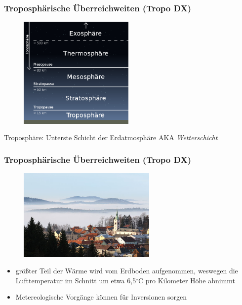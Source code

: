 \begin{frame}
  \frametitle{Troposphärische Überreichweiten (Tropo DX)}

  \begin{center}
    \begin{figure}
      \includegraphics[width=0.5\textwidth,height=.6\textheight,keepaspectratio]{bv11/Atmosphaere_Stufen.png}
    \end{figure}
  \end{center}

  Troposphäre: Unterste Schicht der Erdatmosphäre AKA \emph{Wetterschicht}

\end{frame}

\begin{frame}
  \frametitle{Troposphärische Überreichweiten (Tropo DX)}

  \begin{center}
    \begin{figure}
      \includegraphics[width=0.6\textwidth,height=.5\textheight,keepaspectratio]{bv11/Inversionswetterlage.jpg}
    \end{figure}
  \end{center}

  \begin{itemize}
    \item größter Teil der Wärme wird vom Erdboden aufgenommen, weswegen die
      Lufttemperatur im Schnitt um etwa 6,5$^\circ$C pro Kilometer Höhe abnimmt
    \item Metereologische Vorgänge können für Inversionen sorgen
  \end{itemize}

\end{frame}

